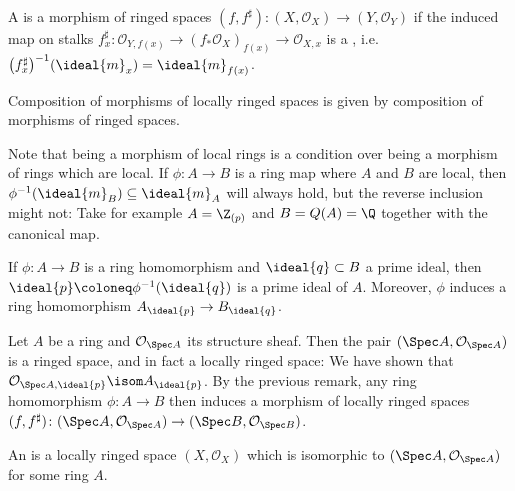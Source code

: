 \documentclass[wip, algebra]{bsteffan-lecturenotes}
\newcommand{\cO}{\mathcal{O}}
\begin{document}
\begin{definition}
	A  is a morphism of ringed spaces $(f, f^\sharp)\colon (X, \cO_X) \to (Y, \cO_Y)$ if the induced map on stalks $f^\sharp_x\colon \cO_{Y, f(x)} \to (f_* \cO_X)_{f(x)} \to \cO_{X, x}$ is a , i.e. $\big(f^\sharp_x\big)^{-1}(\ideal{m}_x) = \ideal{m}_{f(x)}$.

	Composition of morphisms of locally ringed spaces is given by composition of morphisms of ringed spaces.
\end{definition}
\begin{remark}\label{rmk:sch:nonlocal}
	Note that being a morphism of local rings is a condition over being a morphism of rings which are local.
	If $\phi\colon A \to B$ is a ring map where $A$ and $B$ are local, then $\phi^{-1}(\ideal{m}_B) \subseteq \ideal{m}_A$ will always hold, but the reverse inclusion might not:
	Take for example $A = \Z_{(p)}$ and $B = Q(A) = \Q$ together with the canonical map.
\end{remark}
\begin{remark}
	If $\phi\colon A \to B$ is a ring homomorphism and $\ideal{q} \subset B$ a prime ideal, then $\ideal{p} \coloneq \phi^{-1}(\ideal{q})$ is a prime ideal of $A$.
	Moreover, $\phi$ induces a ring homomorphism $A_{\ideal{p}} \to B_{\ideal{q}}$.
\end{remark}
\begin{example}
	Let $A$ be a ring and $\cO_{\Spec A}$ its structure sheaf.
	Then the pair $(\Spec A, \cO_{\Spec A})$ is a ringed space, and in fact a locally ringed space:
	We have shown that $\cO_{\Spec A, \ideal{p}} \isom A_{\ideal{p}}$.
	By the previous remark, any ring homomorphism $\phi\colon A \to B$ then induces a morphism of locally ringed spaces $(f, f^\sharp)\colon (\Spec A, \cO_{\Spec A}) \to (\Spec B, \cO_{\Spec B})$.
\end{example}
\begin{definition}
	An  is a locally ringed space $(X, \cO_X)$ which is isomorphic to $(\Spec A, \cO_{\Spec A})$ for some ring $A$.
\end{definition}
\end{document}
